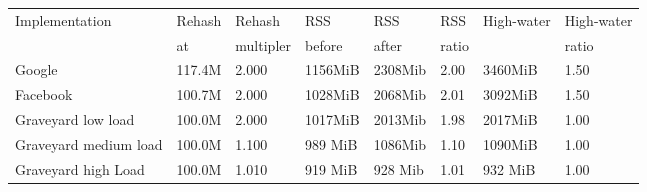 \begin{center}
\begin{tabular}{llllllll}
Implementation        & Rehash & Rehash      & RSS     & RSS     & RSS   & High-water & High-water \\
                      & at     & multipler   & before  & after   & ratio &            & ratio      \\ \hline
Google                & 117.4M & 2.000       & 1156MiB & 2308Mib & 2.00  & 3460MiB    & 1.50       \\
Facebook              & 100.7M & 2.000       & 1028MiB & 2068Mib & 2.01  & 3092MiB    & 1.50       \\
Graveyard low load    & 100.0M & 2.000       & 1017MiB & 2013Mib & 1.98  & 2017MiB    & 1.00       \\
Graveyard medium load & 100.0M & 1.100       & 989 MiB & 1086Mib & 1.10  & 1090MiB    & 1.00       \\
Graveyard high Load   & 100.0M & 1.010       & 919 MiB & 928 Mib & 1.01  & 932 MiB    & 1.00       \\
\end{tabular}
\end{center}
